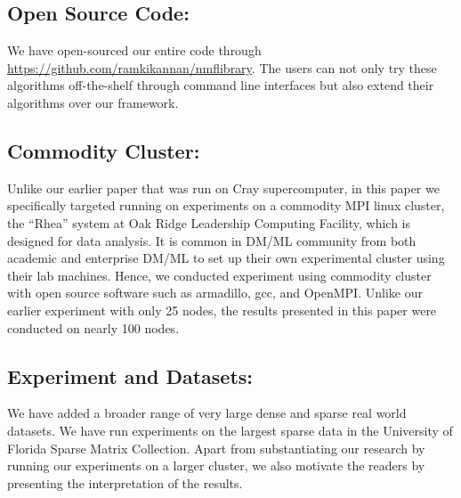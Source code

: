 \documentclass{article}
\begin{document}
\subsection*{Open Source Code:}
We have open-sourced our entire code through \url{https://github.com/ramkikannan/nmflibrary}. The users can not only try these algorithms off-the-shelf through command line interfaces but also extend their algorithms over our framework. 

\subsection*{Commodity Cluster:}
Unlike our earlier paper that was run on Cray supercomputer, in this paper we specifically targeted running on experiments on a commodity MPI linux cluster, the ``Rhea'' system at Oak Ridge Leadership Computing Facility, which is designed for data analysis. It is common in DM/ML community from both academic and enterprise DM/ML to set up their own experimental cluster using their lab machines. Hence, we conducted experiment using commodity cluster with open source software such as armadillo, gcc, and OpenMPI. Unlike our earlier experiment with only 25 nodes, the results presented in this paper were conducted on nearly 100 nodes. 

\subsection*{Experiment and Datasets:}
We have added a broader range of very large dense and sparse real world datasets. We have run experiments on the largest sparse data in the University of Florida Sparse Matrix Collection. Apart from substantiating our research by running our experiments on a larger cluster, we also motivate the readers by presenting the interpretation of the results. 




\end{document}
